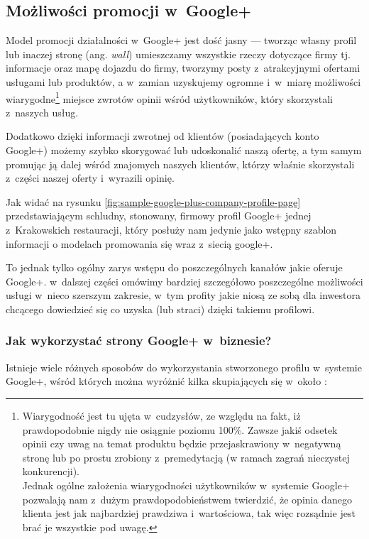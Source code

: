 \subsection{Możliwości promocji w~Google+}
Model promocji działalności w~Google+ jest dość jasny --- tworząc własny profil lub inaczej stronę (ang. \textit{wall}) umieszczamy wszystkie rzeczy dotyczące firmy tj. informacje oraz mapę dojazdu do firmy, tworzymy posty z~atrakcyjnymi ofertami usługami lub produktów, a w~zamian uzyskujemy ogromne i~w~miarę możliwości wiarygodne\footnote{Wiarygodność jest tu ujęta w~cudzysłów, ze względu na fakt, iż prawdopodobnie nigdy nie osiągnie poziomu 100\%. Zawsze jakiś odsetek opinii czy uwag na temat produktu będzie przejaskrawiony w~negatywną stronę lub po prostu zrobiony z~premedytacją (w ramach zagrań nieczystej konkurencji).\\ Jednak ogólne założenia wiarygodności użytkowników w~systemie Google+ pozwalają nam z~dużym prawdopodobieństwem twierdzić, że opinia danego klienta jest jak najbardziej prawdziwa i~wartościowa, tak więc rozsądnie jest brać je wszystkie pod uwagę.} miejsce zwrotów opinii wśród użytkowników, który skorzystali z~naszych usług. 

\noindent Dodatkowo dzięki informacji zwrotnej od klientów (posiadających konto Google+) możemy szybko skorygować lub udoskonalić naszą ofertę, a tym samym promując ją dalej wśród znajomych naszych klientów, którzy właśnie skorzystali z~części naszej oferty i~wyrazili opinię. 

Jak widać na rysunku \ref{fig:sample-google-plus-company-profile-page} przedstawiającym schludny, stonowany, firmowy profil Google+ jednej z~Krakowskich restauracji, który posłuży nam jedynie jako wstępny szablon informacji o modelach promowania się wraz z~siecią google+.

To jednak tylko ogólny zarys wstępu do poszczególnych kanałów jakie oferuje Google+. w~dalszej części omówimy bardziej szczegółowo poszczególne możliwości usługi w~nieco szerszym zakresie, w~tym profity jakie niosą ze sobą dla inwestora chcącego dowiedzieć się co uzyska (lub straci) dzięki takiemu profilowi.



\subsubsection{Jak wykorzystać strony Google+ w~biznesie?}
Istnieje wiele różnych sposobów do wykorzystania stworzonego profilu w~systemie Google+, wśród których można wyróżnić kilka skupiających się w~około \cite[s.119]{Brogan12}:


